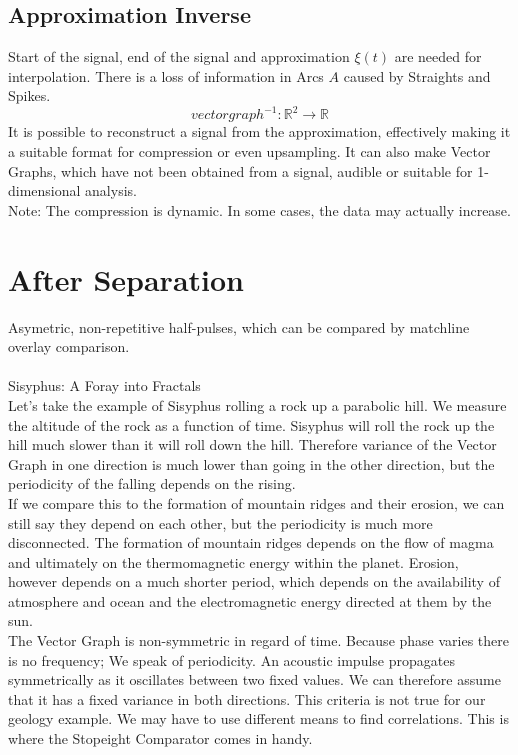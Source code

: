 \documentclass{report}
\begin{document}
\section{Approximation Inverse}
Start of the signal, end of the signal and approximation $\xi(t)$ are needed for interpolation. There is a loss of information in Arcs $A$ caused by Straights and Spikes.
\begin{equation}
vectorgraph^{-1}: \mathbb{R}^2 \rightarrow \mathbb{R}
\end{equation}
It is possible to reconstruct a signal from the approximation, effectively making it a suitable format for compression or even upsampling. It can also make Vector Graphs, which have not been obtained from a signal, audible or suitable for 1-dimensional analysis.\\
Note: The compression is dynamic. In some cases, the data may actually increase.

\chapter{After Separation}
Asymetric, non-repetitive half-pulses, which can be compared by matchline overlay comparison.\\\\
Sisyphus: A Foray into Fractals\\
Let's take the example of Sisyphus rolling a rock up a parabolic hill. We measure the altitude of the rock as a function of time. Sisyphus will roll the rock up the hill much slower than it will roll down the hill. Therefore variance of the Vector Graph in one direction is much lower than going in the other direction, but the periodicity of the falling depends on the rising.\\
If we compare this to the formation of mountain ridges and their erosion, we can still say they depend on each other, but the periodicity is much more disconnected. The formation of mountain ridges depends on the flow of magma and ultimately on the thermomagnetic energy within the planet. Erosion, however depends on a much shorter period, which depends on the availability of atmosphere and ocean and the electromagnetic energy directed at them by the sun.\\
The Vector Graph is non-symmetric in regard of time. Because phase varies there is no frequency; We speak of periodicity. An acoustic impulse propagates symmetrically as it oscillates between two fixed values. We can therefore assume that it has a fixed variance in both directions. This criteria is not true for our geology example. We may have to use different means to find correlations. This is where the Stopeight Comparator comes in handy.\\

\iffalse
\printbibliography
\fi
{}

\end{document}
